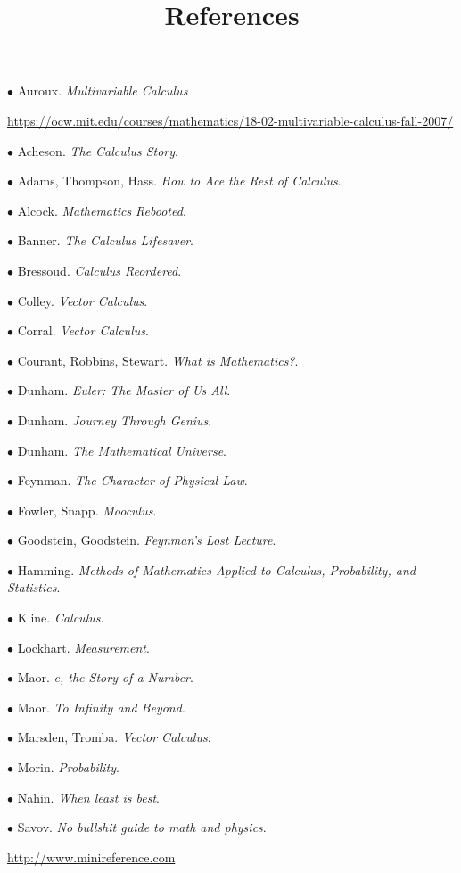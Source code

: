 \documentclass[11pt, oneside]{article}   	%
\title{References}
\date{}
\begin{document}
\maketitle
\Large

$\bullet$ Auroux.  \emph{Multivariable Calculus}

\url{https://ocw.mit.edu/courses/mathematics/18-02-multivariable-calculus-fall-2007/}

$\bullet$ Acheson.  \emph{The Calculus Story}.

$\bullet$ Adams, Thompson, Hass. \emph{How to Ace the Rest of Calculus}.

$\bullet$ Alcock. \emph{Mathematics Rebooted}.

$\bullet$ Banner. \emph{The Calculus Lifesaver}.

$\bullet$ Bressoud. \emph{Calculus Reordered}.

$\bullet$ Colley. \emph{Vector Calculus}.

$\bullet$ Corral. \emph{Vector Calculus}.

$\bullet$ Courant, Robbins, Stewart. \emph{What is Mathematics?}.

$\bullet$ Dunham. \emph{Euler:  The Master of Us All}.

$\bullet$ Dunham. \emph{Journey Through Genius}.

$\bullet$ Dunham. \emph{The Mathematical Universe}.

$\bullet$ Feynman. \emph{The Character of Physical Law}.

$\bullet$ Fowler, Snapp. \emph{Mooculus}.

$\bullet$ Goodstein, Goodstein. \emph{Feynman's Lost Lecture}.

$\bullet$ Hamming.  \emph{Methods of Mathematics Applied to Calculus, Probability, and Statistics}.

$\bullet$ Kline. \emph{Calculus}.

$\bullet$ Lockhart. \emph{Measurement}.

$\bullet$ Maor. \emph{e, the Story of a Number}.

$\bullet$ Maor. \emph{To Infinity and Beyond}.

$\bullet$ Marsden, Tromba. \emph{Vector Calculus}.

$\bullet$ Morin. \emph{Probability}.

$\bullet$ Nahin. \emph{When least is best}.

$\bullet$ Savov. \emph{No bullshit guide to math and physics}.

\url{http://www.minireference.com}
\end{document}
